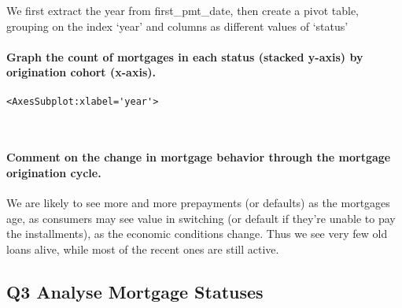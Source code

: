 \documentclass[11pt]{article}
\begin{document}
    We first extract the year from first\_pmt\_date, then create a pivot
table, grouping on the index `year' and columns as different values of
`status'

    \hypertarget{graph-the-count-of-mortgages-in-each-status-stacked-y-axis-by-origination-cohort-x-axis.}{%
\paragraph{Graph the count of mortgages in each status (stacked y-axis)
by origination cohort
(x-axis).}\label{graph-the-count-of-mortgages-in-each-status-stacked-y-axis-by-origination-cohort-x-axis.}}

            \begin{tcolorbox}[breakable, size=fbox, boxrule=.5pt, pad at break*=1mm, opacityfill=0]
\begin{Verbatim}[commandchars=\\\{\}]
<AxesSubplot:xlabel='year'>
\end{Verbatim}
\end{tcolorbox}
        
    \begin{center}
    \end{center}
    { \hspace*{\fill} \\}
    
    \hypertarget{comment-on-the-change-in-mortgage-behavior-through-the-mortgage-origination-cycle.}{%
\paragraph{Comment on the change in mortgage behavior through the
mortgage origination
cycle.}\label{comment-on-the-change-in-mortgage-behavior-through-the-mortgage-origination-cycle.}}

    We are likely to see more and more prepayments (or defaults) as the
mortgages age, as consumers may see value in switching (or default if
they're unable to pay the installments), as the economic conditions
change. Thus we see very few old loans alive, while most of the recent
ones are still active.

    \hypertarget{q3-analyse-mortgage-statuses}{%
\subsection{Q3 Analyse Mortgage
Statuses}\label{q3-analyse-mortgage-statuses}}
\end{document}
